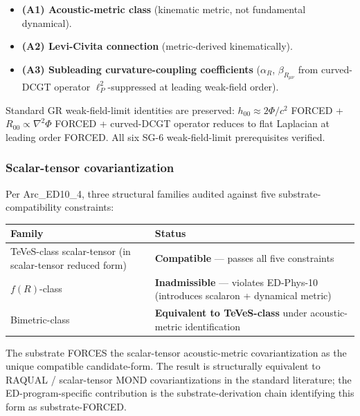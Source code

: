 \documentclass[
]{article}
\newcounter{none} %
\providecommand{\tightlist}{%
  \setlength{\itemsep}{0pt}\setlength{\parskip}{0pt}}
\begin{document}
\begin{itemize}
\tightlist
\item
  \textbf{(A1) Acoustic-metric class} (kinematic metric, not fundamental
  dynamical).
\item
  \textbf{(A2) Levi-Civita connection} (metric-derived kinematically).
\item
  \textbf{(A3) Subleading curvature-coupling coefficients}
  (\(\alpha_R\), \(\beta_{R_{\mu\nu}}\) from curved-DCGT operator
  \(\ell_P^2\)-suppressed at leading weak-field order).
\end{itemize}

Standard GR weak-field-limit identities are preserved:
\(h_{00} \approx 2\Phi/c^2\) FORCED + \(R_{00} \propto \nabla^2\Phi\)
FORCED + curved-DCGT operator reduces to flat Laplacian at leading order
FORCED. All six SG-6 weak-field-limit prerequisites verified.

\subsubsection{Scalar-tensor
covariantization}\label{scalar-tensor-covariantization}

Per Arc\_ED10\_4, three structural families audited against five
substrate-compatibility constraints:

{\def\LTcaptype{none} %
\begin{longtable}[]{@{}
  >{\raggedright\arraybackslash}p{}
  >{\raggedright\arraybackslash}p{}@{}}
\toprule\noalign{}
\begin{minipage}[b]{\linewidth}\raggedright
Family
\end{minipage} & \begin{minipage}[b]{\linewidth}\raggedright
Status
\end{minipage} \\
\midrule\noalign{}
\endhead
\bottomrule\noalign{}
\endlastfoot
TeVeS-class scalar-tensor (in scalar-tensor reduced form) &
\textbf{Compatible} --- passes all five constraints \\
\(f(R)\)-class & \textbf{Inadmissible} --- violates ED-Phys-10
(introduces scalaron + dynamical metric) \\
Bimetric-class & \textbf{Equivalent to TeVeS-class} under
acoustic-metric identification \\
\end{longtable}
}

The substrate FORCES the scalar-tensor acoustic-metric covariantization
as the unique compatible candidate-form. The result is structurally
equivalent to RAQUAL / scalar-tensor MOND covariantizations in the
standard literature; the ED-program-specific contribution is the
substrate-derivation chain identifying this form as substrate-FORCED.
\end{document}
